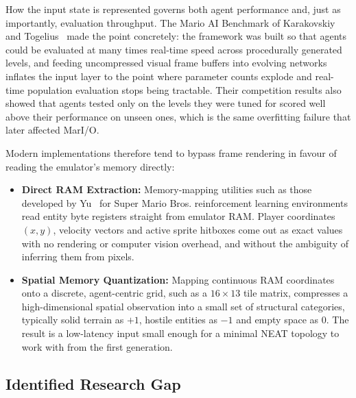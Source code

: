 How the input state is represented governs both agent performance and, just as
importantly, evaluation throughput. The Mario AI Benchmark of Karakovskiy and
Togelius~\cite{karakovskiy2012} made the point concretely: the framework was built so that
agents could be evaluated at many times real-time speed across procedurally
generated levels, and feeding uncompressed visual frame buffers into evolving
networks inflates the input layer to the point where parameter counts explode
and real-time population evaluation stops being tractable. Their competition
results also showed that agents tested only on the levels they were tuned for
scored well above their performance on unseen ones, which is the same
overfitting failure that later affected MarI/O.

\noindent
Modern implementations therefore tend to bypass frame rendering in favour of
reading the emulator's memory directly:

\begin{itemize}
    \item \textbf{Direct RAM Extraction:} Memory-mapping utilities such as
    those developed by Yu~\cite{yu2020} for Super Mario Bros. reinforcement learning
    environments read entity byte registers straight from emulator RAM. Player
    coordinates $(x, y)$, velocity vectors and active sprite hitboxes come out
    as exact values with no rendering or computer vision overhead, and without
    the ambiguity of inferring them from pixels.

    \item \textbf{Spatial Memory Quantization:} Mapping continuous RAM
    coordinates onto a discrete, agent-centric grid, such as a $16 \times 13$
    tile matrix, compresses a high-dimensional spatial observation into a small
    set of structural categories, typically solid terrain as $+1$, hostile
    entities as $-1$ and empty space as $0$. The result is a low-latency input
    small enough for a minimal NEAT topology to work with from the first
    generation.
\end{itemize}

\subsection{Identified Research Gap}
\label{subsec:lit-5}

